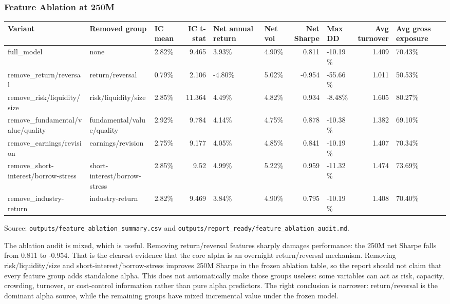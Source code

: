 \documentclass[
]{article}
\begin{document}
\hypertarget{feature-ablation-at-250m}{%
\subsubsection{Feature Ablation at
250M}\label{feature-ablation-at-250m}}

\begin{longtable}[]{@{}lllrllrlrl@{}}
\toprule
Variant & Removed group & IC mean & IC t-stat & Net annual return & Net
vol & Net Sharpe & Max DD & Avg turnover & Avg gross exposure \\
\midrule
\endhead
full\_model & none & 2.82\% & 9.465 & 3.93\% & 4.90\% & 0.811 & -10.19\%
& 1.409 & 70.43\% \\
remove\_return/reversal & return/reversal & 0.79\% & 2.106 & -4.80\% &
5.02\% & -0.954 & -55.66\% & 1.011 & 50.53\% \\
remove\_risk/liquidity/size & risk/liquidity/size & 2.85\% & 11.364 &
4.49\% & 4.82\% & 0.934 & -8.48\% & 1.605 & 80.27\% \\
remove\_fundamental/value/quality & fundamental/value/quality & 2.92\% &
9.784 & 4.14\% & 4.75\% & 0.878 & -10.38\% & 1.382 & 69.10\% \\
remove\_earnings/revision & earnings/revision & 2.75\% & 9.177 & 4.05\%
& 4.85\% & 0.841 & -10.19\% & 1.407 & 70.34\% \\
remove\_short-interest/borrow-stress & short-interest/borrow-stress &
2.85\% & 9.52 & 4.99\% & 5.22\% & 0.959 & -11.32\% & 1.474 & 73.69\% \\
remove\_industry-return & industry-return & 2.82\% & 9.469 & 3.84\% &
4.90\% & 0.795 & -10.19\% & 1.408 & 70.40\% \\
\bottomrule
\end{longtable}

Source: \texttt{outputs/feature\_ablation\_summary.csv} and
\texttt{outputs/report\_ready/feature\_ablation\_audit.md}.

The ablation audit is mixed, which is useful. Removing return/reversal
features sharply damages performance: the 250M net Sharpe falls from
0.811 to -0.954. That is the clearest evidence that the core alpha is an
overnight return/reversal mechanism. Removing risk/liquidity/size and
short-interest/borrow-stress improves 250M Sharpe in the frozen ablation
table, so the report should not claim that every feature group adds
standalone alpha. This does not automatically make those groups useless:
some variables can act as risk, capacity, crowding, turnover, or
cost-control information rather than pure alpha predictors. The right
conclusion is narrower: return/reversal is the dominant alpha source,
while the remaining groups have mixed incremental value under the frozen
model.
\end{document}
